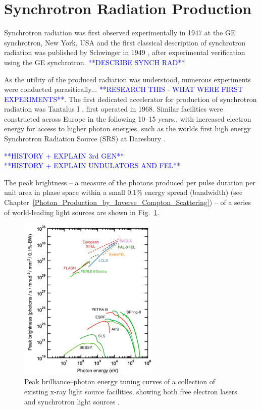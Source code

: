 \documentclass[../main.tex]{subfiles}
\begin{document}
\section{Synchrotron Radiation Production}

Synchrotron radiation was first observed experimentally in 1947 at the GE synchrotron, New York, USA \cite{elder1948radiation} and the first classical description of synchrotron radiation was published by Schwinger in 1949 \cite{schwinger1949classical}, after experimental verification using the GE synchrotron.   
\textcolor{blue}{**DESCRIBE SYNCH RAD**}

As the utility of the produced radiation was understood, numerous experiments were conducted parasitically... \textcolor{blue}{**RESEARCH THIS - WHAT WERE FIRST EXPERIMENTS**}. The first dedicated accelerator for production of synchrotron radiation was Tantalus I \cite{rowe1973tantalus}, first operated in 1968. Similar facilities were constructed across Europe in the following 10--15 years., with increased electron energy for access to higher photon energies, such as the worlds first high energy Synchrotron Radiation Source (SRS) at Daresbury \cite{munro2019fifty,robinson1981experiments}.    

\textcolor{blue}{**HISTORY + EXPLAIN 3rd GEN** \\ **HISTORY + EXPLAIN UNDULATORS AND FEL** }

The peak brightness -- a measure of the photons produced per pulse duration per unit area in phase space within a small 0.1\% energy spread (bandwidth) (see Chapter~\ref{Photon_Production_by_Inverse_Compton_Scattering}) -- of a series of world-leading light sources are shown in Fig.~\ref{fig:light_source_tuning_curves}.

\begin{figure}[!h]
\centering
\includegraphics[width=0.6\textwidth]{Figures/Introduction/Light_Source_Brilliance_Energy.pdf}
\caption{Peak brilliance--photon energy tuning curves of a collection of existing x-ray light source facilities, showing both free electron lasers and synchrotron light sources \cite{geloni2017physics}.}
\label{fig:light_source_tuning_curves}
\end{figure}
\end{document}
